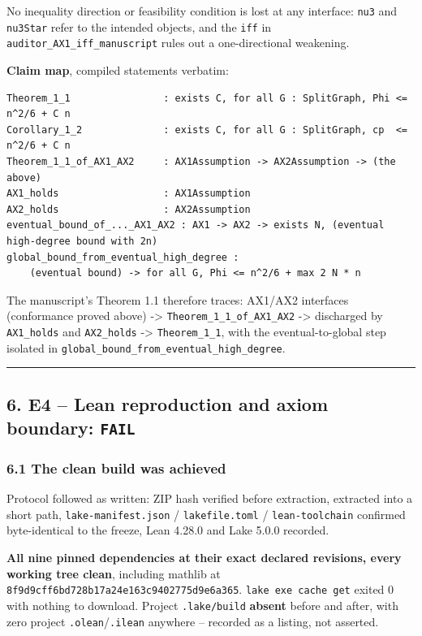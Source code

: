 \documentclass[
  10pt,
]{article}
\begin{document}
No inequality direction or feasibility condition is lost at any
interface: \texttt{nu3} and \texttt{nu3Star} refer to the intended
objects, and the \texttt{iff} in \texttt{auditor\_AX1\_iff\_manuscript}
rules out a one-directional weakening.

\textbf{Claim map}, compiled statements verbatim:

\begin{verbatim}
Theorem_1_1                : exists C, for all G : SplitGraph, Phi <= n^2/6 + C n
Corollary_1_2              : exists C, for all G : SplitGraph, cp  <= n^2/6 + C n
Theorem_1_1_of_AX1_AX2     : AX1Assumption -> AX2Assumption -> (the above)
AX1_holds                  : AX1Assumption
AX2_holds                  : AX2Assumption
eventual_bound_of_..._AX1_AX2 : AX1 -> AX2 -> exists N, (eventual high-degree bound with 2n)
global_bound_from_eventual_high_degree :
    (eventual bound) -> for all G, Phi <= n^2/6 + max 2 N * n
\end{verbatim}

The manuscript's Theorem 1.1 therefore traces: AX1/AX2 interfaces
(conformance proved above) -\textgreater{}
\texttt{Theorem\_1\_1\_of\_AX1\_AX2} -\textgreater{} discharged by
\texttt{AX1\_holds} and \texttt{AX2\_holds} -\textgreater{}
\texttt{Theorem\_1\_1}, with the eventual-to-global step isolated in
\texttt{global\_bound\_from\_eventual\_high\_degree}.

\begin{center}\rule{0.5\linewidth}{0.5pt}\end{center}

\subsection{\texorpdfstring{6. E4 -- Lean reproduction and axiom
boundary:
\texttt{FAIL}}{6. E4 -- Lean reproduction and axiom boundary: FAIL}}\label{e4-lean-reproduction-and-axiom-boundary-fail}

\subsubsection{6.1 The clean build was
achieved}\label{the-clean-build-was-achieved}

Protocol followed as written: ZIP hash verified before extraction,
extracted into a short path, \texttt{lake-manifest.json} /
\texttt{lakefile.toml} / \texttt{lean-toolchain} confirmed
byte-identical to the freeze, Lean 4.28.0 and Lake 5.0.0 recorded.

\textbf{All nine pinned dependencies at their exact declared revisions,
every working tree clean}, including mathlib at
\texttt{8f9d9cff6bd728b17a24e163c9402775d9e6a365}.
\texttt{lake\ exe\ cache\ get} exited 0 with nothing to download.
Project \texttt{.lake/build} \textbf{absent} before and after, with zero
project \texttt{.olean}/\texttt{.ilean} anywhere -- recorded as a
listing, not asserted.
\end{document}
